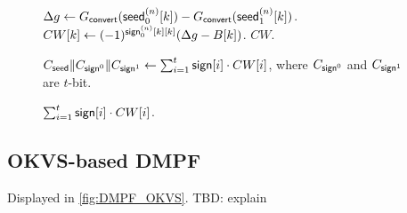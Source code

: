 \begin{figure}
{{\begin{algorithmic}
        \State $\Delta g\gets G_{\sf convert}({\sf seed}_0^{(n)}[k]) - G_{\sf convert}({\sf seed}_1^{(n)}[k])$. 
        \State$CW[k]\gets (-1)^{{\sf sign}_0^{(n)}[k][k]}(\Delta g-B[k])$.
      \EndFor
      \State \Return $CW$. 
    \EndProcedure
    \item[]
      \State \Return $C_{{\sf seed}}\|C_{{\sf sign}^0}\|C_{{\sf sign}^1}\gets\sum_{i=1}^t {\sf sign}[i]\cdot CW[i]$, where $C_{{\sf sign}^0}$ and $C_{{\sf sign}^1}$ are $t$-bit. 
    \EndProcedure
    \item[]
      \State \Return $\sum_{i=1}^t {\sf sign}[i]\cdot CW[i]$. 
    \EndProcedure
  \end{algorithmic}}}
\end{figure}


\subsection{OKVS-based DMPF}
Displayed in \cref{fig:DMPF_OKVS}. 
TBD: explain
\newpage
